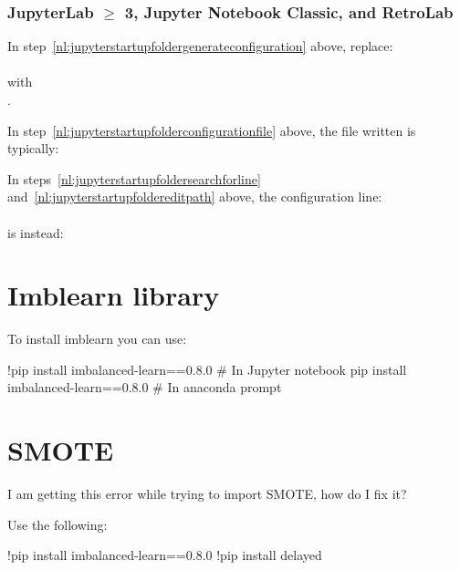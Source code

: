 	\subsubsection{JupyterLab $\geq$ 3, Jupyter Notebook Classic, and RetroLab}
	\begin{bulletedlist}
		\item In step~\ref{nl:jupyterstartupfoldergenerateconfiguration} above, replace:\\ \\ with\\ .
		\item In step~\ref{nl:jupyterstartupfolderconfigurationfile} above, the file written is typically:\\ 

		\item In steps~\ref{nl:jupyterstartupfoldersearchforline} and~\ref{nl:jupyterstartupfoldereditpath} above, the configuration line:\\ \\ is instead:\\ 
	\end{bulletedlist}


	\section{Imblearn library}
To install imblearn you can use:
	\begin{code}[\codenumbering]{}
		\codeitemnonumber !pip install imbalanced-learn==0.8.0 \# In Jupyter notebook
		\codeitemnonumber pip install imbalanced-learn==0.8.0 \# In anaconda prompt
	\end{code}


	\section{SMOTE}
I am getting this error while trying to import SMOTE, how do I fix it?

\noindent{}

Use the following:
	\begin{code}[\codenumbering]{}
		\codeitemnonumber !pip install imbalanced-learn==0.8.0
		\codeitemnonumber !pip install delayed
	\end{code}


